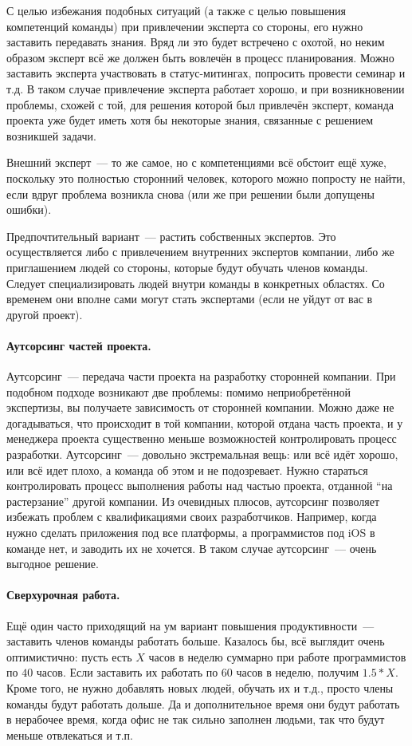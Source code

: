 \documentclass{../../text-style}
\begin{document}
С целью избежания подобных ситуаций (а также с целью повышения компетенций команды) при привлечении эксперта со стороны, его нужно заставить передавать знания. Вряд ли это будет встречено с охотой, но неким образом эксперт всё же должен быть вовлечён в процесс планирования. Можно заставить эксперта участвовать в статус-митингах, попросить провести семинар и т.д. В таком случае привлечение эксперта работает хорошо, и при возникновении проблемы, схожей с той, для решения которой был привлечён эксперт, команда проекта уже будет иметь хотя бы некоторые знания, связанные с решением возникшей задачи.

Внешний эксперт~--- то же самое, но с компетенциями всё обстоит ещё хуже, поскольку это полностью сторонний человек, которого можно попросту не найти, если вдруг проблема возникла снова (или же при решении были допущены ошибки).

Предпочтительный вариант~--- растить собственных экспертов. Это осуществляется либо с привлечением внутренних экспертов компании, либо же приглашением людей со стороны, которые будут обучать членов команды. Следует специализировать людей внутри команды в конкретных областях. Со временем они вполне сами могут стать экспертами (если не уйдут от вас в другой проект).

\paragraph{Аутсорсинг частей проекта.} Аутсорсинг~--- передача части проекта на разработку сторонней компании. При подобном подходе возникают две проблемы: помимо неприобретённой экспертизы, вы получаете зависимость от сторонней компании. Можно даже не догадываться, что происходит в той компании, которой отдана часть проекта, и у менеджера проекта существенно меньше возможностей контролировать процесс разработки. Аутсорсинг~--- довольно экстремальная вещь: или всё идёт хорошо, или всё идет плохо, а команда об этом и не подозревает. Нужно стараться контролировать процесс выполнения работы над частью проекта, отданной \enquote{на растерзание} другой компании. Из очевидных плюсов, аутсорсинг позволяет избежать проблем с квалификациями своих разработчиков. Например, когда нужно сделать приложения под все платформы, а программистов под iOS в команде нет, и заводить их не хочется. В таком случае аутсорсинг~--- очень выгодное решение.

\paragraph{Сверхурочная работа.} Ещё один часто приходящий на ум вариант повышения продуктивности~--- заставить членов команды работать больше. Казалось бы, всё выглядит очень оптимистично: пусть есть $X$ часов в неделю суммарно при работе программистов по $40$ часов. Если заставить их работать по $60$ часов в неделю, получим $1.5 * X$. Кроме того, не нужно добавлять новых людей, обучать их и т.д., просто члены команды будут работать дольше. Да и дополнительное время они будут работать в нерабочее время, когда офис не так сильно заполнен людьми, так что будут меньше отвлекаться и т.п.
\end{document}
